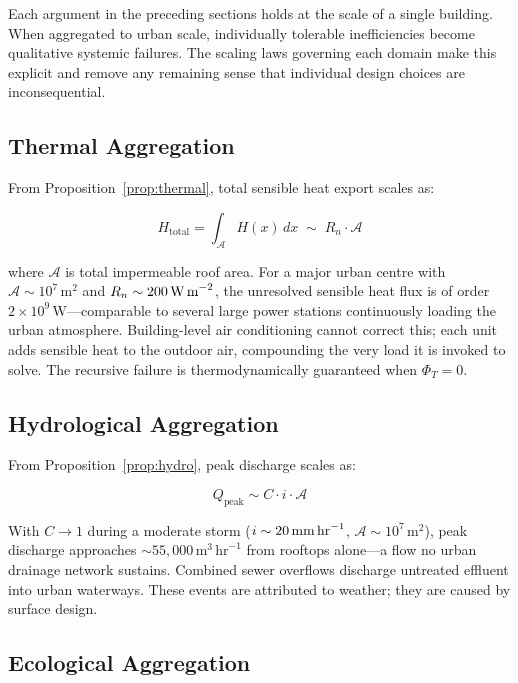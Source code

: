 \documentclass[12pt, a4paper]{article}
\theoremstyle{plain}
\theoremstyle{remark}
\begin{document}
Each argument in the preceding sections holds at the scale of a single building. When aggregated to urban scale, individually tolerable inefficiencies become qualitative systemic failures. The scaling laws governing each domain make this explicit and remove any remaining sense that individual design choices are inconsequential.

\subsection{Thermal Aggregation}

From Proposition~\ref{prop:thermal}, total sensible heat export scales as:

\begin{equation}
H_{\text{total}} = \int_{\mathcal{A}} H(x)\,dx \;\sim\; R_n \cdot \mathcal{A}
\label{eq:thermal_scaling}
\end{equation}

\noindent where $\mathcal{A}$ is total impermeable roof area. For a major urban centre with $\mathcal{A} \sim 10^7\,\text{m}^2$ and $R_n \sim 200\,\text{W\,m}^{-2}$, the unresolved sensible heat flux is of order $2 \times 10^9\,\text{W}$---comparable to several large power stations continuously loading the urban atmosphere. Building-level air conditioning cannot correct this; each unit adds sensible heat to the outdoor air, compounding the very load it is invoked to solve. The recursive failure is thermodynamically guaranteed when $\Phi_T = 0$.

\subsection{Hydrological Aggregation}

From Proposition~\ref{prop:hydro}, peak discharge scales as:

\begin{equation}
Q_{\text{peak}} \sim C \cdot i \cdot \mathcal{A}
\label{eq:hydro_scaling}
\end{equation}

\noindent With $C \to 1$ during a moderate storm ($i \sim 20\,\text{mm\,hr}^{-1}$, $\mathcal{A} \sim 10^7\,\text{m}^2$), peak discharge approaches $\sim 55{,}000\,\text{m}^3\,\text{hr}^{-1}$ from rooftops alone---a flow no urban drainage network sustains. Combined sewer overflows discharge untreated effluent into urban waterways. These events are attributed to weather; they are caused by surface design.

\subsection{Ecological Aggregation}
\end{document}
